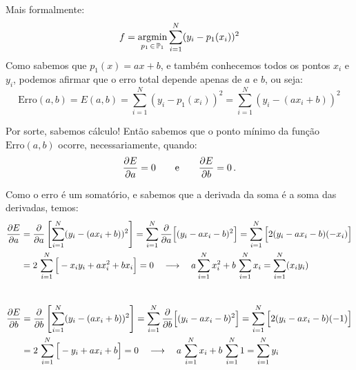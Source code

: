 \documentclass[12pt]{report}
\begin{document}
\color{blue}	
	Mais formalmente:
	\begin{equation}
		f =  \argmin_{p_1 \,\in\, \mathbb{P}_1} \sum_{i=1}^{N}(y_i - p_1(x_i))^2
	\end{equation}
	Como sabemos que $p_1(x)=ax+b$, e também conhecemos todos os pontos $x_i$ e $y_i$, podemos afirmar que o erro total depende apenas de $a$ e $b$, ou seja:
	\begin{equation}
		\mathrm{Erro}(a, b) = E(a, b) = \sum_{i=1}^{N}(y_i - p_1(x_i))^2 = \sum_{i=1}^{N}(y_i - (a x_i + b))^2
	\end{equation}
	
	Por sorte, sabemos cálculo! Então sabemos que o ponto mínimo da função $\text{Erro}(a, b)$ ocorre, necessariamente, quando:
	\begin{equation*}
		\frac{\partial E}{\partial a} = 0 \qquad \text{e} \qquad \frac{\partial E}{\partial b} = 0 
		\,.
	\end{equation*}
		
	Como o erro é um somatório, e sabemos que a derivada da soma é a soma das derivadas, temos:
	\begin{equation}
	\begin{split}
		\displaystyle \frac{\partial E}{\partial a} 
			&= \displaystyle \frac{\partial }{\partial a} \left[ \sum_{i=1}^{N}(y_i - (a x_i + b))^2 \right]
			 = \displaystyle \sum_{i=1}^{N} \frac{\partial }{\partial a} \Big[ (y_i - a x_i - b)^2 \Big]
			 = \displaystyle \sum_{i=1}^{N} \Big[ 2 (y_i - a x_i - b) (-x_i) \Big]
			 \\
			&= \displaystyle 2\, \sum_{i=1}^{N} \Big[ - x_i y_i + a x_i^2 +  bx_i  \Big] = 0
			\quad \longrightarrow \quad
			 a \sum_{i=1}^{N} x_i^2 + b \, \sum_{i=1}^{N} x_i   = \sum_{i=1}^{N} (x_i y_i)
		\\ \displaystyle
	\end{split}
	\end{equation}
	
	
	\begin{equation}
	\begin{split}
		\displaystyle \frac{\partial E}{\partial b} 
			&= \displaystyle \frac{\partial }{\partial b} \left[ \sum_{i=1}^{N}(y_i - (a x_i + b))^2 \right]
			 = \displaystyle \sum_{i=1}^{N} \frac{\partial }{\partial b} \Big[ (y_i - a x_i - b)^2 \Big]
			 = \displaystyle \sum_{i=1}^{N} \Big[ 2 (y_i - a x_i - b) (-1) \Big]
			 \\
			&= \displaystyle 2 \, \sum_{i=1}^{N} \Big[ - y_i + a x_i + b \Big] = 0
			\quad \longrightarrow \quad
			a\, \sum_{i=1}^{N} x_i + b\, \sum_{i=1}^{N} 1 = \sum_{i=1}^{N} y_i
	\end{split}
	\label{e:mmq-exemplo1-2}
	\end{equation}
	
\end{document}
